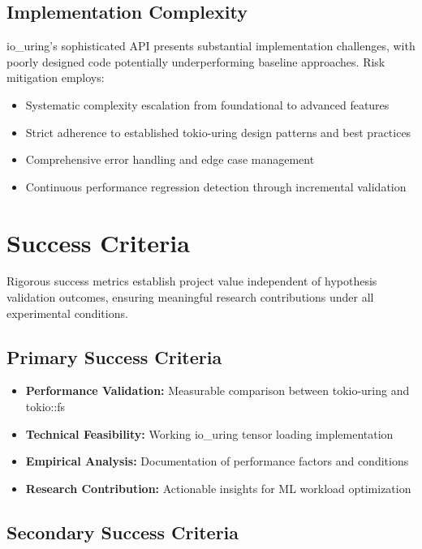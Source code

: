 \documentclass{article}
\begin{document}
\subsection{Implementation Complexity}

io\_uring's sophisticated API presents substantial implementation challenges, with poorly designed code potentially underperforming baseline approaches. Risk mitigation employs:
\begin{itemize}
\item Systematic complexity escalation from foundational to advanced features
\item Strict adherence to established tokio-uring design patterns and best practices
\item Comprehensive error handling and edge case management
\item Continuous performance regression detection through incremental validation
\end{itemize}

\section{Success Criteria}

Rigorous success metrics establish project value independent of hypothesis validation outcomes, ensuring meaningful research contributions under all experimental conditions.

\subsection{Primary Success Criteria}

\begin{itemize}
\item \textbf{Performance Validation:} Measurable comparison between tokio-uring and tokio::fs
\item \textbf{Technical Feasibility:} Working io\_uring tensor loading implementation
\item \textbf{Empirical Analysis:} Documentation of performance factors and conditions
\item \textbf{Research Contribution:} Actionable insights for ML workload optimization
\end{itemize}

\subsection{Secondary Success Criteria}
\end{document}
